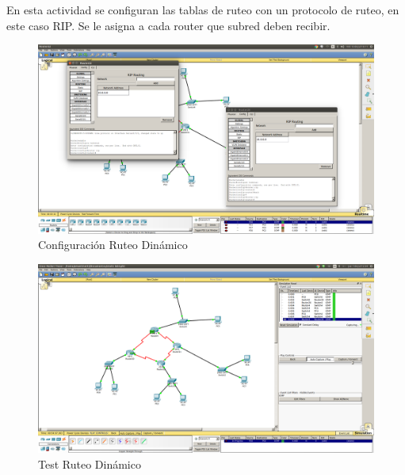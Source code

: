 ﻿\documentclass[spanish]{udpreport}
\begin{document}
En esta actividad se configuran las tablas de ruteo con un protocolo de ruteo, en este caso RIP. Se le asigna a cada router que subred deben recibir.
\begin{figure}[H]
	\centering
	\includegraphics[scale=.25]{imagenes/ruteo_dinamic.png}
	\caption{Configuración Ruteo Dinámico}
	\label{fig:Figura 4.1}
\end{figure}

\begin{figure}[H]
	\centering
	\includegraphics[scale=.25]{imagenes/test_rdinamic.png}
	\caption{Test Ruteo Dinámico}
	\label{fig:Figura 4.2}
\end{figure}
\end{document}
